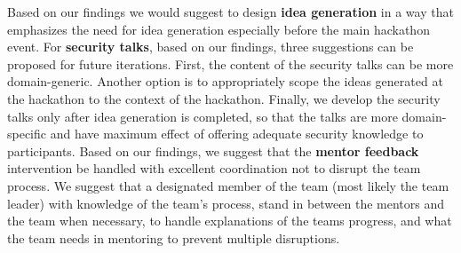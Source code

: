 \documentclass[runningheads]{llncs}
\begin{document}
Based on our findings we would suggest to design \textbf{idea generation} in a way that emphasizes the need for idea generation especially before the main hackathon event.
For \textbf{security talks}, based on our findings, three suggestions can be proposed for future iterations.
First, the content of the security talks can be more domain-generic. Another option is to appropriately scope the ideas generated at the hackathon to the context of the hackathon. Finally, we develop the security talks only after idea generation is completed, so that the talks are more domain-specific and have maximum effect of offering adequate security knowledge to participants.
Based on our findings, we suggest that the \textbf{mentor feedback} intervention be handled with excellent coordination not to disrupt the team process. 
We suggest that a designated member of the team (most likely the team leader) with knowledge of the team's process, stand in between the mentors and the team when necessary, to handle explanations of the teams progress, and what the team needs in mentoring to prevent multiple disruptions.
\end{document}
